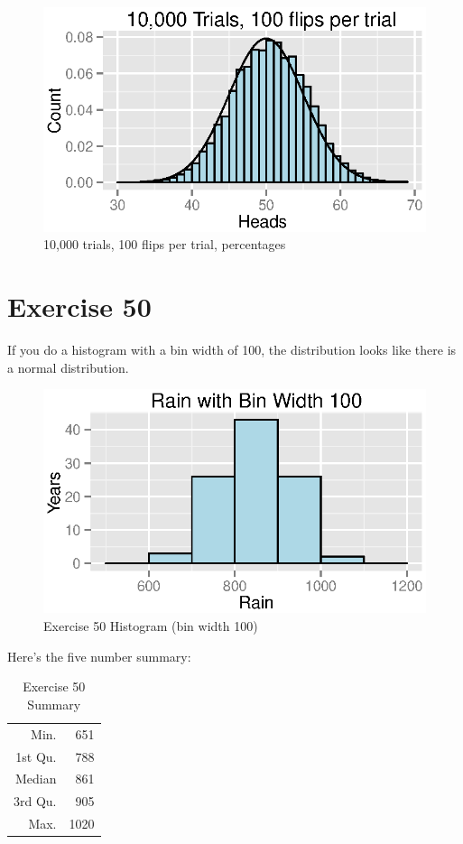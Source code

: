 \documentclass{exam}
\begin{document}
  \begin{figure}[H]
    \centering
    \includegraphics{figures/coins/10000_100.eps}
    \caption{10,000 trials, 100 flips per trial, percentages}
  \end{figure}

  \section{Exercise 50}
  If you do a histogram with a bin width of 100, the distribution looks like there
  is a normal distribution.

  \begin{figure}[H]
    \centering
    \includegraphics{figures/ex50_histogram_100.eps}
    \caption{Exercise 50 Histogram (bin width 100)}
  \end{figure}

  Here's the five number summary:
  \begin{table}[H]
    \centering
    \begin{tabular}{rr}
      \toprule
      Min.    & 651 \\
      1st Qu. & 788 \\
      Median  & 861 \\
      3rd Qu. & 905 \\
      Max.    & 1020 \\
      \bottomrule
    \end{tabular}
    \caption{Exercise 50 Summary}
  \end{table}
\end{document}
